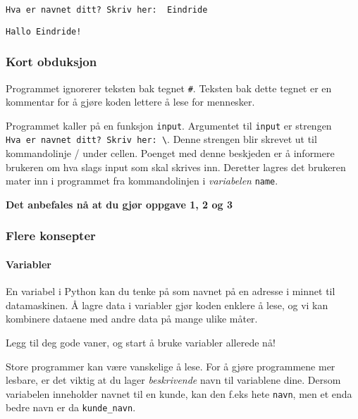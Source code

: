 \documentclass[11pt]{article}
\begin{document}
    \begin{Verbatim}[commandchars=\\\{\}]
Hva er navnet ditt? Skriv her:  Eindride
    \end{Verbatim}

    \begin{Verbatim}[commandchars=\\\{\}]
Hallo Eindride!
    \end{Verbatim}

    \hypertarget{kort-obduksjon}{%
\subsubsection{Kort obduksjon}\label{kort-obduksjon}}

Programmet ignorerer teksten bak tegnet \texttt{\#}. Teksten bak dette
tegnet er en kommentar for å gjøre koden lettere å lese for mennesker.

Programmet kaller på en funksjon \texttt{input}. Argumentet til
\texttt{input} er strengen
\texttt{Hva\ er\ navnet\ ditt?\ Skriv\ her:\ \textbackslash{}}. Denne
strengen blir skrevet ut til kommandolinje / under cellen. Poenget med
denne beskjeden er å informere brukeren om hva slags input som skal
skrives inn. Deretter lagres det brukeren mater inn i programmet fra
kommandolinjen i \emph{variabelen} \texttt{name}.

    \textbf{Det anbefales nå at du gjør oppgave 1, 2 og 3}

    \hypertarget{flere-konsepter}{%
\subsubsection{Flere konsepter}\label{flere-konsepter}}

    \hypertarget{variabler}{%
\paragraph{Variabler}\label{variabler}}

En variabel i Python kan du tenke på som navnet på en adresse i minnet
til datamaskinen. Å lagre data i variabler gjør koden enklere å lese, og
vi kan kombinere dataene med andre data på mange ulike måter.

Legg til deg gode vaner, og start å bruke variabler allerede nå!

    Store programmer kan være vanskelige å lese. For å gjøre programmene mer
lesbare, er det viktig at du lager \emph{beskrivende} navn til
variablene dine. Dersom variabelen inneholder navnet til en kunde, kan
den f.eks hete \texttt{navn}, men et enda bedre navn er da
\texttt{kunde\_navn}.
\end{document}
